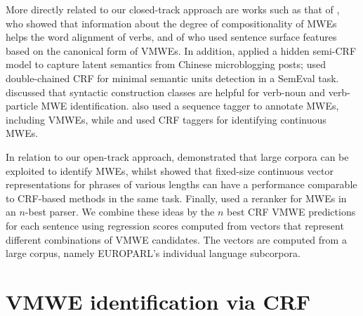 \documentclass[output=paper
,modfonts
,nonflat]{langsci/langscibook}
\begin{document}
More directly related to our closed-track approach are works such as that of  \cite{Venkatapathy:2006:UIM:1613692.1613697}, who showed that information about the degree of compositionality of MWEs helps the word alignment of verbs, and of \cite{BoukobzaR09} who used sentence surface features based on the canonical form of VMWEs. In addition, \cite{conf/ialp/SunLTR13} applied a hidden semi-CRF model to capture latent semantics from Chinese microblogging posts; \cite{DBLP:conf/semeval/HosseiniSL16} used double-chained CRF for minimal semantic units detection in a SemEval task. \cite{Bar2014} discussed that syntactic construction classes are helpful for verb-noun{} and verb-particle MWE identification. \cite{Schneider14b} also used a sequence tagger to annotate MWEs, including VMWEs, while \cite{blunsom-baldwin:2006:EMNLP} and \cite{wiki50} used CRF taggers for identifying continuous MWEs. 

In relation to our open-track approach, \cite{attia2010automatic} demonstrated that large corpora can be exploited to identify MWEs, whilst \cite{legrand2016phrase} showed that fixed-size continuous vector representations for phrases of various lengths can have a performance comparable to CRF-based methods in the same task. Finally, \cite{Constant2012} used a reranker for MWEs in an $n$-best parser. We combine these ideas by  the $n$ best CRF VMWE predictions for each sentence using regression scores computed from vectors that represent different combinations of VMWE candidates. The vectors are computed from a large corpus, namely EUROPARL's individual language subcorpora.  %


\section{\label{subsec:CRF}VMWE identification via CRF}
\end{document}
